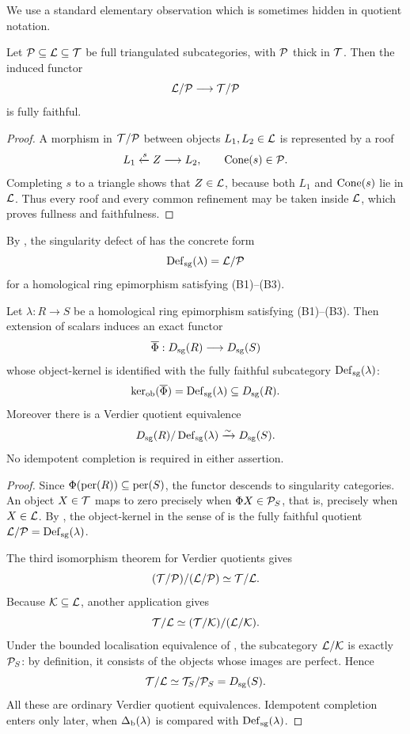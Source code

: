 We use a standard elementary observation which is sometimes hidden in quotient notation.

\begin{lemma}\label{lem:subcategory-quotient-embedding}
Let \(\mathcal P\subseteq\mathcal L\subseteq\mathcal T\) be full triangulated subcategories, with \(\mathcal P\) thick in \(\mathcal T\).  Then the induced functor
\[
 \mathcal L/\mathcal P\longrightarrow\mathcal T/\mathcal P
\]
is fully faithful.
\end{lemma}

\begin{proof}
A morphism in \(\mathcal T/\mathcal P\) between objects \(L_1,L_2\in\mathcal L\) is represented by a roof
\[
 L_1\xleftarrow{s}Z\longrightarrow L_2,
 \qquad \operatorname{Cone}(s)\in\mathcal P.
\]
Completing \(s\) to a triangle shows that \(Z\in\mathcal L\), because both
\(L_1\) and \(\operatorname{Cone}(s)\) lie in \(\mathcal L\).  Thus every roof and every common refinement may be taken inside \(\mathcal L\), which proves fullness and faithfulness.
\end{proof}

By , the singularity defect of  has the concrete form
\[
 \operatorname{Def}_{\mathrm{sg}}(\lambda)=\mathcal L/\mathcal P
\]
for a homological ring epimorphism satisfying \textup{(B1)--(B3)}.

\begin{theorem}\label{thm:actual-kernel}
Let \(\lambda:R\to S\) be a homological ring epimorphism satisfying \textup{(B1)--(B3)}.  Then extension of scalars induces an exact functor
\[
 \overline\Phi:D_{\mathrm{sg}}(R)\longrightarrow D_{\mathrm{sg}}(S)
\]
whose object-kernel is identified with the fully faithful subcategory \(\operatorname{Def}_{\mathrm{sg}}(\lambda)\):
\[
 \ker_{\mathrm{ob}}(\overline\Phi)=\operatorname{Def}_{\mathrm{sg}}(\lambda)\subseteq D_{\mathrm{sg}}(R).
\]
Moreover there is a Verdier quotient equivalence
\[
 D_{\mathrm{sg}}(R)/\operatorname{Def}_{\mathrm{sg}}(\lambda)\xrightarrow{\sim}D_{\mathrm{sg}}(S).
\]
No idempotent completion is required in either assertion.
\end{theorem}

\begin{proof}
Since \(\Phi(\operatorname{per}(R))\subseteq\operatorname{per}(S)\), the functor descends to singularity categories.  An object \(X\in\mathcal T\) maps to zero precisely when
\(\Phi X\in\mathcal P_S\), that is, precisely when \(X\in\mathcal L\).  By
, the object-kernel in the sense of  is the fully faithful quotient \(\mathcal L/\mathcal P=\operatorname{Def}_{\mathrm{sg}}(\lambda)\).

The third isomorphism theorem for Verdier quotients gives
\[
 (\mathcal T/\mathcal P)/(\mathcal L/\mathcal P)\simeq\mathcal T/\mathcal L.
\]
Because \(\mathcal K\subseteq\mathcal L\), another application gives
\[
 \mathcal T/\mathcal L\simeq (\mathcal T/\mathcal K)/(\mathcal L/\mathcal K).
\]
Under the bounded localisation equivalence of , the subcategory \(\mathcal L/\mathcal K\) is exactly \(\mathcal P_S\): by definition, it consists of the objects whose images are perfect.  Hence
\[
 \mathcal T/\mathcal L\simeq\mathcal T_S/\mathcal P_S=D_{\mathrm{sg}}(S).
\]
All these are ordinary Verdier quotient equivalences.  Idempotent completion enters only later, when \(\Delta_{\mathrm b}(\lambda)\) is compared with \(\operatorname{Def}_{\mathrm{sg}}(\lambda)\).
\end{proof}

